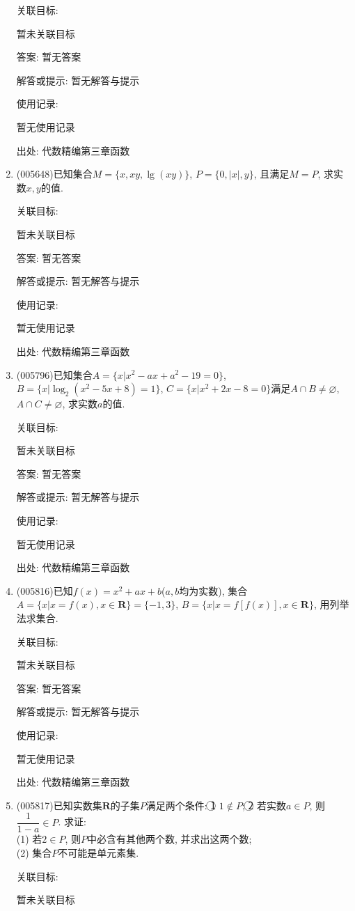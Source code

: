 \documentclass[10pt,a4paper]{article}
\begin{document}
\begin{enumerate}[1.]
关联目标:

暂未关联目标

答案: 暂无答案

解答或提示: 暂无解答与提示

使用记录:

暂无使用记录


出处: 代数精编第三章函数
\item { (005648)}已知集合$M=\{x,xy,\lg (xy)\}$, $P=\{0,|x|,y\}$, 且满足$M=P$, 求实数$x,y$的值.


关联目标:

暂未关联目标

答案: 暂无答案

解答或提示: 暂无解答与提示

使用记录:

暂无使用记录


出处: 代数精编第三章函数
\item { (005796)}已知集合$A=\{x|x^2-ax+a^2-19=0\}$, $B=\{x|\log_2(x^2-5x+8)=1\}$, $C=\{x|x^2+2x-8=0\}$满足$A\cap B\ne \varnothing$, $A\cap C\ne \varnothing$, 求实数$a$的值.


关联目标:

暂未关联目标

答案: 暂无答案

解答或提示: 暂无解答与提示

使用记录:

暂无使用记录


出处: 代数精编第三章函数
\item { (005816)}已知$f(x)=x^2+ax+b$($a,b$均为实数), 集合$A=\{x|x=f(x) ,x\in \mathbf{R}\}=\{-1,3\}$, $B=\{x|x=f[f(x)],x\in \mathbf{R}\}$, 用列举法求集合.


关联目标:

暂未关联目标

答案: 暂无答案

解答或提示: 暂无解答与提示

使用记录:

暂无使用记录


出处: 代数精编第三章函数
\item { (005817)}已知实数集$\mathbf{R}$的子集$P$满足两个条件: \textcircled{1} $1\notin P$; \textcircled{2} 若实数$a\in P$, 则$\dfrac 1{1-a}\in P$. 求证:\\
(1) 若$2\in P$, 则$P$中必含有其他两个数, 并求出这两个数;\\
(2) 集合$P$不可能是单元素集.


关联目标:

暂未关联目标


\end{enumerate}
\end{document}
